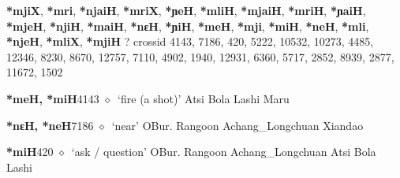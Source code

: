 \item
\textbf{*mjiX}, \textbf{*mri}, \textbf{*njaiH}, \textbf{*mriX}, \textbf{*ɲeH}, \textbf{*mliH}, \textbf{*mjaiH}, \textbf{*mriH}, \textbf{*ɲaiH}, \textbf{*mjeH}, \textbf{*njiH}, \textbf{*maiH}, \textbf{*nɛH}, \textbf{*ɲiH}, \textbf{*meH}, \textbf{*mji}, \textbf{*miH}, \textbf{*neH}, \textbf{*mli}, \textbf{*njeH}, \textbf{*mliX}, \textbf{*mjiH}
?
  {\tiny crossid 4143, 7186, 420, 5222, 10532, 10273, 4485, 12346, 8230, 8670, 12757, 7110, 4902, 1940, 12931, 6360, 5717, 2852, 8939, 2877, 11672, 1502}
  \begin{list}{}{\leftmargin=1.5em \itemindent=-1.5em}
  \item {\footnotesize \textbf{*meH, *miH}}{\tiny 4143}
         $\diamond$~`fire (a shot)'
         Atsi 
\hspace{1ex}
         Bola 
\hspace{1ex}
         Lashi 
\hspace{1ex}
         Maru 
  \item {\footnotesize \textbf{*nɛH, *neH}}{\tiny 7186}
\hspace{1ex}
         $\diamond$~`near'
         OBur. 
\hspace{1ex}
         Rangoon 
\hspace{1ex}
         Achang\_Longchuan 
\hspace{1ex}
         Xiandao 
  \item {\footnotesize \textbf{*miH}}{\tiny 420}
\hspace{1ex}
         $\diamond$~`ask / question'
         OBur. 
\hspace{1ex}
         Rangoon 
\hspace{1ex}
         Achang\_Longchuan 
\hspace{1ex}
         Atsi 
\hspace{1ex}
         Bola 
\hspace{1ex}
         Lashi 
\hspace{1ex}

\end{list}
